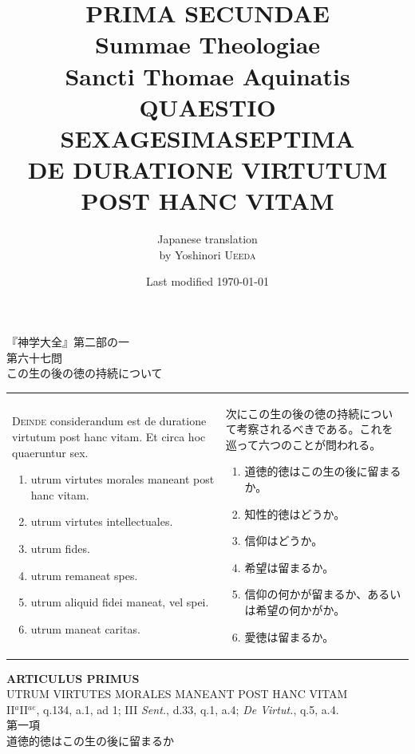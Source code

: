 \documentclass[paper=a4paper,fontsize=10pt,jafontsize=9pt,titlepage]{jlreq}
\title{{\bfseries PRIMA SECUNDAE}\\{\Huge Summae Theologiae}\\Sancti Thomae
Aquinatis\\{\sffamily QUAESTIO SEXAGESIMASEPTIMA}\\DE DURATIONE VIRTUTUM POST HANC VITAM}
\author{Japanese translation\\by Yoshinori {\scshape Ueeda}}
\date{Last modified \today}
\begin{document}
\maketitle
\thispagestyle{empty}

\begin{center}
{\LARGE 『神学大全』第二部の一}\\
{\Large 第六十七問\\この生の後の徳の持続について}
\end{center}

\begin{longtable}{p{21em}p{21em}}
{\scshape Deinde} considerandum est de duratione virtutum post hanc
 vitam. Et circa hoc quaeruntur sex.

 \begin{enumerate}
  \item utrum virtutes morales maneant post hanc vitam.
  \item utrum virtutes intellectuales.
  \item utrum fides.
  \item utrum remaneat spes.
  \item utrum aliquid fidei maneat, vel spei.
  \item utrum maneat caritas.
 \end{enumerate}

 &

 次にこの生の後の徳の持続について考察されるべきである。これを巡って六つのことが問われる。

 \begin{enumerate}
  \item 道徳的徳はこの生の後に留まるか。
  \item 知性的徳はどうか。
  \item 信仰はどうか。
  \item 希望は留まるか。
  \item 信仰の何かが留まるか、あるいは希望の何かがか。
  \item 愛徳は留まるか。
 \end{enumerate}
 
\end{longtable}


\newpage

\begin{center}
{\Large {\bfseries ARTICULUS PRIMUS}}\\
{\large UTRUM VIRTUTES MORALES MANEANT POST HANC VITAM}\\
{\footnotesize II$^{a}$II$^{ae}$, q.134, a.1, ad 1; III {\itshape Sent.}, d.33, q.1, a.4; {\itshape De Virtut.}, q.5, a.4.}\\
{\Large 第一項\\道徳的徳はこの生の後に留まるか}
\end{center}
\end{document}
